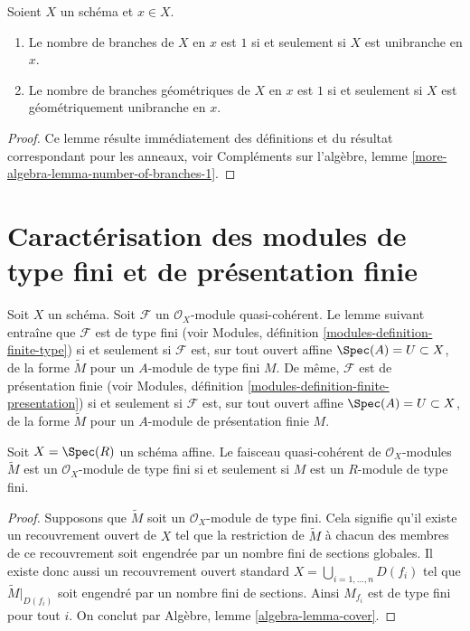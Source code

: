 \begin{lemma}
\label{lemma-number-of-branches-1}
Soient $X$ un schéma et $x \in X$.
\begin{enumerate}
\item Le nombre de branches de $X$ en $x$ est $1$ si et seulement si
$X$ est unibranche en $x$.
\item Le nombre de branches géométriques de $X$ en $x$ est $1$ si et seulement si
$X$ est géométriquement unibranche en $x$.
\end{enumerate}
\end{lemma}

\begin{proof}
Ce lemme résulte immédiatement des définitions et du résultat correspondant
pour les anneaux, voir Compléments sur l'algèbre, lemme
\ref{more-algebra-lemma-number-of-branches-1}.
\end{proof}
\section{Caractérisation des modules de type fini et de présentation finie}
\label{section-characterizing-finite-type-presentation}

\noindent
Soit $X$ un schéma.
Soit $\mathcal{F}$ un $\mathcal{O}_X$-module quasi-cohérent.
Le lemme suivant entraîne que $\mathcal{F}$ est de type fini
(voir Modules, définition \ref{modules-definition-finite-type})
si et seulement si $\mathcal{F}$ est,
sur tout ouvert affine $\Spec(A) = U \subset X$,
de la forme $\widetilde M$ pour un $A$-module de type fini $M$.
De même, $\mathcal{F}$ est de présentation finie
(voir Modules, définition \ref{modules-definition-finite-presentation})
si et seulement si $\mathcal{F}$ est,
sur tout ouvert affine $\Spec(A) = U \subset X$,
de la forme $\widetilde M$ pour un $A$-module de présentation finie $M$.

\begin{lemma}
\label{lemma-finite-type-module}
Soit $X = \Spec(R)$ un schéma affine.
Le faisceau quasi-cohérent de $\mathcal{O}_X$-modules
$\widetilde M$ est un $\mathcal{O}_X$-module de type fini
si et seulement si $M$ est un $R$-module de type fini.
\end{lemma}

\begin{proof}
Supposons que $\widetilde M$ soit un $\mathcal{O}_X$-module de type fini.
Cela signifie qu'il existe un recouvrement ouvert de $X$ tel que
la restriction de $\widetilde M$ à chacun des membres de ce recouvrement soit
engendrée par un nombre fini de sections globales.
Il existe donc aussi un recouvrement ouvert standard
$X = \bigcup_{i = 1, \ldots, n} D(f_i)$ tel que $\widetilde M|_{D(f_i)}$
soit engendré par un nombre fini de sections. Ainsi $M_{f_i}$ est de type
fini pour tout $i$. On conclut par
Algèbre, lemme \ref{algebra-lemma-cover}.
\end{proof}

